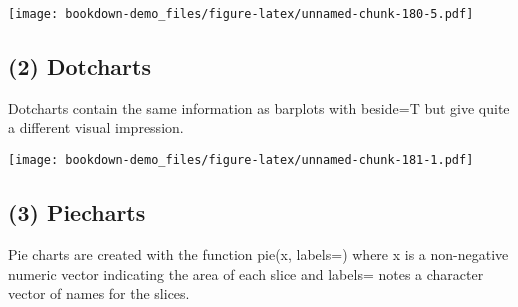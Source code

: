 \documentclass[]{book}
\newenvironment{Shaded}{\begin{snugshade}}{\end{snugshade}}
\newcommand{\KeywordTok}[1]{\textcolor[rgb]{0.13,0.29,0.53}{\textbf{#1}}}
\newcommand{\DataTypeTok}[1]{\textcolor[rgb]{0.13,0.29,0.53}{#1}}
\newcommand{\DecValTok}[1]{\textcolor[rgb]{0.00,0.00,0.81}{#1}}
\newcommand{\StringTok}[1]{\textcolor[rgb]{0.31,0.60,0.02}{#1}}
\newcommand{\CommentTok}[1]{\textcolor[rgb]{0.56,0.35,0.01}{\textit{#1}}}
\newcommand{\OtherTok}[1]{\textcolor[rgb]{0.56,0.35,0.01}{#1}}
\newcommand{\OperatorTok}[1]{\textcolor[rgb]{0.81,0.36,0.00}{\textbf{#1}}}
\newcommand{\NormalTok}[1]{#1}
\theoremstyle{definition}
\theoremstyle{definition}
\theoremstyle{definition}
\theoremstyle{remark}
\begin{document}
\begin{Shaded}
\end{Shaded}

\texttt{[image: bookdown-demo\_files/figure-latex/unnamed-chunk-180-5.pdf]}

\subsection{(2) Dotcharts}\label{dotcharts}

Dotcharts contain the same information as barplots with beside=T but
give quite a different visual impression.

\begin{Shaded}
\end{Shaded}

\texttt{[image: bookdown-demo\_files/figure-latex/unnamed-chunk-181-1.pdf]}

\subsection{(3) Piecharts}\label{piecharts}

Pie charts are created with the function pie(x, labels=) where x is a
non-negative numeric vector indicating the area of each slice and
labels= notes a character vector of names for the slices.
\end{document}
